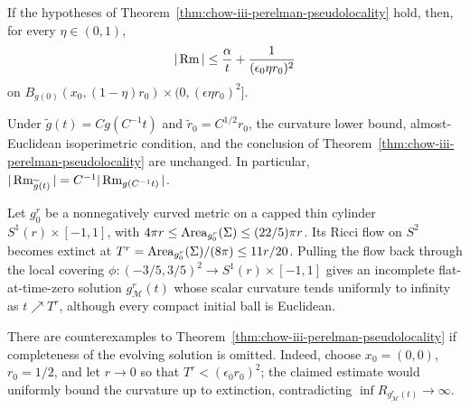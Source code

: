 \begin{corollary}
\label{cor:chow-iii-interior-curvature-estimate}
If the hypotheses of Theorem~\ref{thm:chow-iii-perelman-pseudolocality} hold,
then, for every \(\eta\in(0,1)\),
\[
|\operatorname{Rm}|\le\frac\alpha t+\frac1{(\epsilon_0\eta r_0)^2}
\]
on \(B_{g(0)}(x_0,(1-\eta)r_0)\times(0,(\epsilon\eta r_0)^2]\).
\end{corollary}

\begin{remark}
\label{rem:chow-iii-pseudolocality-scale-invariance}
Under \(\widetilde g(t)=Cg(C^{-1}t)\) and \(\widetilde r_0=C^{1/2}r_0\),
the curvature lower bound, almost-Euclidean isoperimetric condition, and
the conclusion of Theorem~\ref{thm:chow-iii-perelman-pseudolocality} are
unchanged.  In particular, \(|\operatorname{Rm}_{\widetilde g(t)}|=C^{-1}|\operatorname{Rm}_{g(C^{-1}t)}|\).
\end{remark}

\begin{example}
\label{ex:chow-iii-topping-incomplete-solution}
Let \(g_0^r\) be a nonnegatively curved metric on a capped thin cylinder
\(S^1(r)\times[-1,1]\), with
\(4\pi r\le\operatorname{Area}_{g_0^r}(\Sigma)\le(22/5)\pi r\).  Its Ricci flow on
\(S^2\) becomes extinct at \(T^r=\operatorname{Area}_{g_0^r}(\Sigma)/(8\pi)\le11r/20\).
Pulling the flow back through the local covering
\(\phi:(-3/5,3/5)^2\to S^1(r)\times[-1,1]\) gives an incomplete flat-at-time-zero
solution \(g_{\mathcal M}^r(t)\) whose scalar curvature tends uniformly to
infinity as \(t\nearrow T^r\), although every compact initial ball is Euclidean.
\end{example}

\begin{theorem}[Topping]
\label{thm:chow-iii-topping-counterexample}
There are counterexamples to Theorem~\ref{thm:chow-iii-perelman-pseudolocality}
if completeness of the evolving solution is omitted.  Indeed, choose
\(x_0=(0,0)\), \(r_0=1/2\), and let \(r\to0\) so that \(T^r<
(\epsilon_0r_0)^2\); the claimed estimate would uniformly bound the curvature
up to extinction, contradicting \(\inf R_{g_{\mathcal M}^r(t)}\to\infty\).
\end{theorem}


